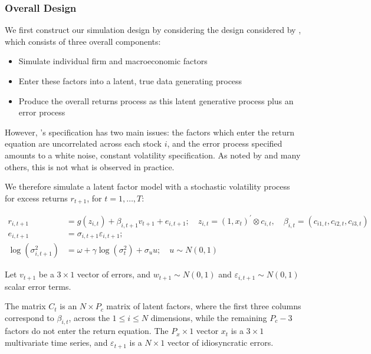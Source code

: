 \documentclass[11pt, a4paper, table]{article}
\begin{document}
\subsubsection{Overall Design}

We first construct our simulation design by considering the design considered by \cite{gu_empirical_2018}, which consists of three overall components:
\begin{itemize}
	\item Simulate individual firm and macroeconomic factors
	\item Enter these factors into a latent, true data generating process
	\item Produce the overall returns process as this latent generative process plus an error process
\end{itemize}

However, \cite{gu_empirical_2018}'s specification has two main issues: the factors which enter the return equation are uncorrelated across each stock $i$, and the error process specified amounts to a white noise, constant volatility specification. As noted by \cite{harvey__2016} and many others, this is not what is observed in practice. 

We therefore simulate a latent factor model with a stochastic volatility process for excess returns  $r_{t+1}$, for $t=1,\dots,T$:

\begin{align}
r_{i, t+1} &= 
g\left(z_{i, t}\right) + \beta_{i,t+1}v_{t+1} + e_{i, t+1}; 
	\quad z_{i, t}=\left(1, x_{t}\right)^{\prime} \otimes c_{i, t}, 
		\quad \beta_{i, t}=\left(c_{i 1, t}, c_{i 2, t}, c_{i 3, t}\right) \\ 
e_{i, t+1} &= 
	\sigma_{i, t+1} \varepsilon_{i, t+1}; \\
\operatorname{log} (\sigma^2_{i,t+1}) &= 
	\omega + \gamma \operatorname{log} (\sigma^2_{t}) + \sigma_{u}u; 
	\quad u \sim N(0, 1)
\end{align}

Let $v_{t+1}$ be a $3\times 1$ vector of errors, and $w_{t+1} \sim N(0, 1)$ and $\varepsilon_{i,t+1} \sim N(0, 1)$ scalar error terms. 

The matrix $C_t$ is an $N\times P_c$ matrix of latent factors, where the first three columns correspond to $\beta_{i,t}$, across the $1\leq i\leq N$ dimensions, while the remaining $P_c-3$ factors do not enter the return equation. The $P_x\times1$ vector $x_t$ is a $3 \times 1$ multivariate time series, and $\varepsilon_{t+1}$ is a $N\times 1$ vector of idiosyncratic errors. 
\end{document}

